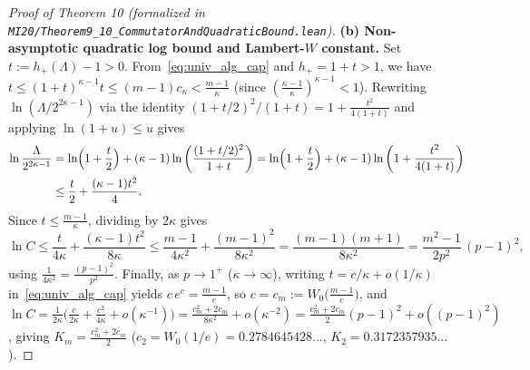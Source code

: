 \documentclass[10pt,letterpaper]{article}
\begin{document}
\begin{proof}[Proof of Theorem 10 (formalized in \texttt{MI20/Theorem9\_10\_\allowbreak CommutatorAndQuadraticBound.lean})]
\textbf{(b) Non-asymptotic quadratic log bound and Lambert-$W$ constant.} Set $t := h_+(\Lambda) - 1 > 0$. From~\eqref{eq:univ_alg_cap} and $h_+ = 1 + t > 1$, we have $t \le (1+t)^{\kappa-1} t \le (m-1)c_\kappa < \frac{m-1}{\kappa}$ (since $(\frac{\kappa-1}{\kappa})^{\kappa-1} < 1$). Rewriting $\ln(\Lambda / 2^{2\kappa-1})$ via the identity $(1 + t/2)^2 / (1 + t) = 1 + \frac{t^2}{4(1+t)}$ and applying $\ln(1 + u) \le u$ gives
\begin{align*}
  \ln\frac{\Lambda}{2^{2\kappa-1}}
  &= \ln\Bigl(1 + \frac{t}{2}\Bigr) + (\kappa - 1)\ln\left(\frac{(1 + t/2)^2}{1 + t}\right)
   = \ln\Bigl(1 + \frac{t}{2}\Bigr) + (\kappa - 1)\ln\left(1 + \frac{t^2}{4(1+t)}\right) \\
  &\le \frac{t}{2} + \frac{(\kappa - 1) t^2}{4}.
\end{align*}
Since $t \le \frac{m-1}{\kappa}$, dividing by $2\kappa$ gives
\[
  \ln C \le \frac{t}{4\kappa} + \frac{(\kappa - 1)t^2}{8\kappa}
  \le \frac{m - 1}{4\kappa^2} + \frac{(m - 1)^2}{8\kappa^2}
  = \frac{(m - 1)(m + 1)}{8\kappa^2}
  = \frac{m^2 - 1}{2p^2}\,(p - 1)^2,
\]
using $\frac{1}{4\kappa^2} = \frac{(p-1)^2}{p^2}$. Finally, as $p \to 1^+$ ($\kappa \to \infty$), writing $t = c/\kappa + o(1/\kappa)$ in~\eqref{eq:univ_alg_cap} yields $c\, e^c = \frac{m-1}{e}$, so $c = c_m := W_0\bigl(\frac{m-1}{e}\bigr)$, and $\ln C = \frac{1}{2\kappa}\bigl(\frac{c}{2\kappa} + \frac{c^2}{4\kappa} + o(\kappa^{-1})\bigr) = \frac{c_m^2 + 2c_m}{8\kappa^2} + o(\kappa^{-2}) = \frac{c_m^2 + 2c_m}{2}(p - 1)^2 + o((p-1)^2)$, giving $K_m = \frac{c_m^2 + 2c_m}{2}$ ($c_2 = W_0(1/e) = 0.2784645428\dots$, $K_2 = 0.3172357935\dots$).
\end{proof}
\end{document}
